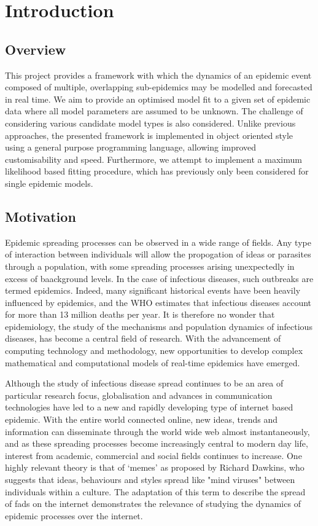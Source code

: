 \documentclass[11pt, a4paper, oneside,titlepage]{article}
\begin{document}
\newpage
\section{Introduction}
\subsection{Overview}
This project provides a framework with which the dynamics of
an epidemic event composed of multiple, overlapping sub-epidemics may be modelled and
forecasted in real time. We aim to provide an optimised model fit to a
given set of epidemic data where all model parameters are assumed to
be unknown. The challenge of considering various candidate model
types is also considered. Unlike previous approaches, the presented framework is
implemented in object oriented style using a general purpose
programming language, allowing improved customisability and
speed. Furthermore, we attempt to implement a maximum likelihood based
fitting procedure, which has previously only been considered for
single epidemic models.


\subsection{Motivation}
Epidemic spreading processes can be observed in a wide range of
fields. Any type of interaction between individuals will allow the
propogation of ideas or parasites through a population, with some spreading
processes arising unexpectedly in excess of baackground levels. In the case of
infectious diseases, such outbreaks are termed epidemics. Indeed, many significant
historical events have been heavily influenced by epidemics, and the
WHO estimates that infectious diseases account for more than 13
million deaths per year.\cite{who} It is therefore no wonder that
epidemiology, the study of the mechanisms and population dynamics of
infectious diseases, has become a central field of research. With the
advancement of computing technology and methodology, new opportunities
to develop complex mathematical and computational models of real-time
epidemics have emerged.

Although the study of infectious disease spread continues to be an
area of particular research focus, globalisation and advances in
communication technologies have led to a new and rapidly developing
type of internet based epidemic. With the entire world connected
online, new ideas, trends and information can disseminate through the
world wide web almost instantaneously, and as these spreading
processes become increasingly central to modern day life, interest
from academic, commercial and social fields continues to increase. One
highly relevant theory is that of `memes' as proposed by Richard
Dawkins, who suggests that ideas, behaviours and styles spread like
"mind viruses" between individuals within a culture.\cite{dawkins} The
adaptation of this term to describe the spread of fads on the internet
demonstrates the relevance of studying the dynamics of epidemic
processes over the internet. \cite{meme}
\end{document}
